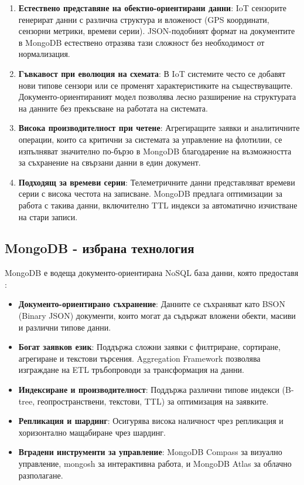 \begin{enumerate}
    \item \textbf{Естествено представяне на обектно-ориентирани данни}: IoT сензорите генерират данни с различна структура и вложеност (GPS координати, сензорни метрики, времеви серии). JSON-подобният формат на документите в MongoDB естествено отразява тази сложност без необходимост от нормализация.

    \item \textbf{Гъвкавост при еволюция на схемата}: В IoT системите често се добавят нови типове сензори или се променят характеристиките на съществуващите. Документо-ориентираният модел позволява лесно разширение на структурата на данните без прекъсване на работата на системата.

    \item \textbf{Висока производителност при четене}: Агрегиращите заявки и аналитичните операции, които са критични за системата за управление на флотилии, се изпълняват значително по-бързо в MongoDB благодарение на възможността за съхранение на свързани данни в един документ.

    \item \textbf{Подходящ за времеви серии}: Телеметричните данни представляват времеви серии с висока честота на записване. MongoDB предлага оптимизации за работа с такива данни, включително TTL индекси за автоматично изчистване на стари записи.
\end{enumerate}

\subsection{MongoDB - избрана технология}

MongoDB е водеща документо-ориентирана NoSQL база данни, която предоставя \cite{mongodb_docs}:

\begin{itemize}
    \item \textbf{Документо-ориентирано съхранение}: Данните се съхраняват като BSON (Binary JSON) документи, които могат да съдържат вложени обекти, масиви и различни типове данни.

    \item \textbf{Богат заявков език}: Поддържа сложни заявки с филтриране, сортиране, агрегиране и текстови търсения. Aggregation Framework позволява изграждане на ETL тръбопроводи за трансформация на данни.

    \item \textbf{Индексиране и производителност}: Поддържа различни типове индекси (B-tree, геопространствени, текстови, TTL) за оптимизация на заявките.

    \item \textbf{Репликация и шардинг}: Осигурява висока наличност чрез репликация и хоризонтално мащабиране чрез шардинг.

    \item \textbf{Вградени инструменти за управление}: MongoDB Compass за визуално управление, mongosh за интерактивна работа, и MongoDB Atlas за облачно разполагане.
\end{itemize}

